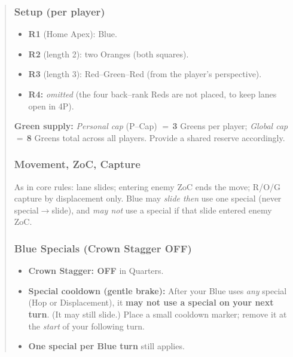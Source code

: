 \documentclass[11pt]{article}
\begin{document}
\begin{quote}
\subsubsection*{Setup (per player)}
\begin{itemize}[leftmargin=1.3em,itemsep=0.25em]
  \item \textbf{R1} (Home Apex): Blue.
  \item \textbf{R2} (length 2): two Oranges (both squares).
  \item \textbf{R3} (length 3): Red--Green--Red (from the player's perspective).
  \item \textbf{R4:} \emph{omitted} (the four back--rank Reds are not placed, to keep lanes open in 4P).
\end{itemize}
\noindent\textbf{Green supply:} \emph{Personal cap} (P--Cap) $=\,$\textbf{3} Greens per player; \emph{Global cap} $=\,$\textbf{8} Greens total across all players. Provide a shared reserve accordingly.

\subsubsection*{Movement, ZoC, Capture}
\noindent As in core rules: lane slides; entering enemy ZoC ends the move; R/O/G capture by displacement only. Blue may \emph{slide then} use one special (never special$\rightarrow$slide), and \emph{may not} use a special if that slide entered enemy ZoC.

\subsubsection*{Blue Specials (Crown Stagger OFF)}
\begin{itemize}[leftmargin=1.3em,itemsep=0.25em]
  \item \textbf{Crown Stagger: OFF} in Quarters.
  \item \textbf{Special cooldown (gentle brake):} After your Blue uses \emph{any} special (Hop or Displacement), it \textbf{may not use a special on your next turn}. (It may still slide.) Place a small cooldown marker; remove it at the \emph{start} of your following turn.
  \item \textbf{One special per Blue turn} still applies.
\end{itemize}


\end{quote}
\end{document}
